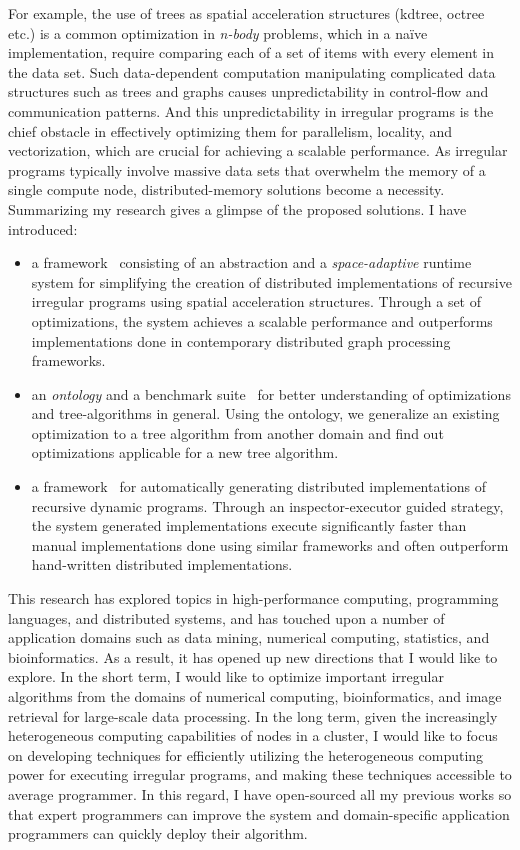 For example, the use of trees as spatial acceleration structures (kdtree, octree etc.) is a common optimization in {\em n-body} problems, which in a na\"ive implementation, require comparing each of a set of items with every element in the data set. 
Such data-dependent computation manipulating complicated data structures such as trees and graphs causes unpredictability in control-flow and communication patterns. 
And this unpredictability in irregular programs is the chief obstacle in effectively optimizing them for parallelism, locality, and vectorization, which are crucial for achieving a scalable performance. 
As irregular programs typically involve massive data sets that overwhelm the memory of a single compute node, distributed-memory solutions become a necessity. 
Summarizing my research gives a glimpse of the proposed solutions. I have introduced:
\begin{itemize}
\item a framework~\cite{hegde17ics} consisting of an abstraction and a {\em space-adaptive} runtime system for simplifying the creation of distributed implementations of recursive irregular programs using spatial acceleration structures. Through a set of optimizations, the system achieves a scalable performance and outperforms implementations done in contemporary distributed graph processing frameworks.
\item an {\em ontology} and a benchmark suite~\cite{hegde17ispass} for better understanding of optimizations and tree-algorithms in general. Using the ontology, we generalize an existing optimization to a tree algorithm from another domain and find out optimizations applicable for a new tree algorithm.
\item a framework~\cite{hegde19d2p} for automatically generating distributed implementations of recursive dynamic programs. Through an inspector-executor guided strategy, the system generated implementations execute significantly faster than manual implementations done using similar frameworks and often outperform hand-written distributed implementations.
\end{itemize} 
 
This research has explored topics in high-performance computing, programming languages, and distributed systems, and has touched upon a number of application domains such as data mining, numerical computing, statistics, and bioinformatics. 
As a result, it has opened up new directions that I would like to explore. In the short term, I would like to optimize important irregular algorithms from the domains of numerical computing, bioinformatics, and image retrieval for large-scale data processing.
In the long term, given the increasingly heterogeneous computing capabilities of nodes in a cluster, I would like to focus on developing techniques for efficiently utilizing the heterogeneous computing power for executing irregular programs, and making these techniques accessible to average programmer. 
In this regard, I have open-sourced all my previous works so that expert programmers can improve the system and domain-specific application programmers can quickly deploy their algorithm.  

